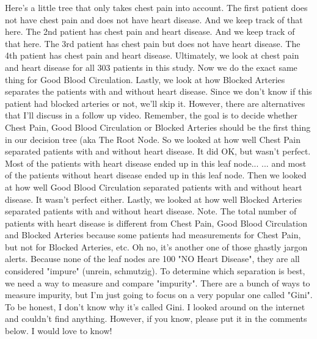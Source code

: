 \documentclass[
	final,
	a4paper,
	oneside,
	parskip=full,
	headings=standardclasses,
	headings=big,
	pointednumbers
]{scrartcl}
\begin{document}
        Here's a little tree that only takes chest pain into account.
        The first patient does not have chest pain and does not have heart disease.
        And we keep track of that here.
        The 2nd patient has chest pain and heart disease.
        And we keep track of that here.
        The 3rd patient has chest pain but does not have heart disease.
        The 4th patient has chest pain and heart disease.
        Ultimately, we look at chest pain and heart disease for all 303
        patients in this study.
        Now we do the exact same thing for Good Blood Circulation.
        Lastly, we look at how Blocked Arteries separates the patients with
        and without heart disease.
        Since we don't know if this patient had blocked arteries or not,
        we'll skip it.
        However, there are alternatives that I'll discuss in a follow up video.
        Remember, the goal is to decide whether Chest Pain,
        Good Blood Circulation or Blocked Arteries should be the first thing
        in our decision tree (aka The Root Node.
        So we looked at how well Chest Pain separated patients with and without
        heart disease.
        It did OK, but wasn't perfect.
        Most of the patients with heart disease ended up in this leaf node...
        ... and most of the patients without heart disease ended up in this leaf node.
        Then we looked at how well Good Blood Circulation separated patients with
        and without heart disease.
        It wasn't perfect either.
        Lastly, we looked at how well Blocked Arteries separated patients
        with and without heart disease.
        Note. The total number of patients with heart disease is different
        from Chest Pain,
        Good Blood Circulation and Blocked Arteries because some patients
        had measurements for Chest Pain, but not for Blocked Arteries, etc.
        Oh no, it's another one of those ghastly jargon alerts.
        Because none of the leaf nodes are 100%
        "NO Heart Disease", they are all considered "impure" (unrein, schmutzig).
        To determine which separation is best, we need a way to measure and
        compare "impurity".
        There are a bunch of ways to measure impurity, but I'm just going to
        focus on a very popular one called "Gini".
        To be honest, I don't know why it's called Gini.
        I looked around on the internet and couldn't find anything.
        However, if you know, please put it in the comments below.
        I would love to know!
        
\end{document}
